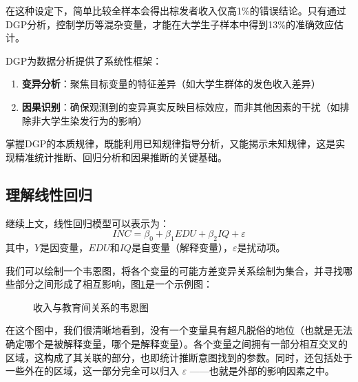 在这种设定下，简单比较全样本会得出棕发者收入仅高1\%的错误结论。只有通过DGP分析，控制学历等混杂变量，才能在大学生子样本中得到13\%的准确效应估计。

DGP为数据分析提供了系统性框架：  
\begin{enumerate}
    \item \textbf{变异分析}：聚焦目标变量的特征差异（如大学生群体的发色收入差异）
    \item \textbf{因果识别}：确保观测到的变异真实反映目标效应，而非其他因素的干扰（如排除非大学生染发行为的影响）
\end{enumerate}  

掌握DGP的本质规律，既能利用已知规律指导分析，又能揭示未知规律，这是实现精准统计推断、回归分析和因果推断的关键基础。

\subsection{理解线性回归}

继续上文，线性回归模型可以表示为：
\begin{equation}
	INC = \beta_0 + \beta_1 EDU + \beta_2 IQ + \varepsilon
\end{equation}
其中，$Y$是因变量，$EDU$和$IQ$是自变量（解释变量），$\varepsilon$是扰动项。

我们可以绘制一个韦恩图，将各个变量的可能方差变异关系绘制为集合，并寻找哪些部分之间形成了相互影响，图\ref{fig:venn}是一个示例图：

\begin{figure}[ht]
	\centering
	\caption{收入与教育间关系的韦恩图}
	\label{fig:venn}
\end{figure}

在这个图中，我们很清晰地看到，没有一个变量具有超凡脱俗的地位（也就是无法确定哪个是被解释变量，哪个是解释变量）。各个变量之间拥有一部分相互交叉的区域，这构成了其关联的部分，也即统计推断意图找到的参数。同时，还包括处于一些外在的区域，这一部分完全可以归入 $\varepsilon$ ——也就是外部的影响因素之中。

